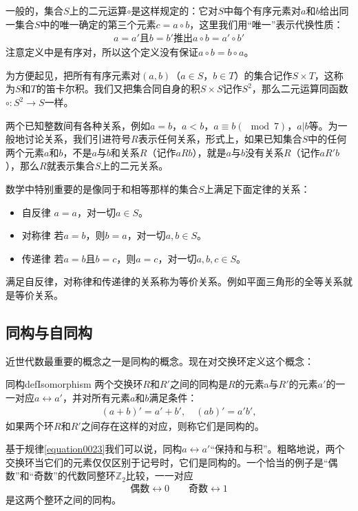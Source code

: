 一般的，集合$S$上的二元运算$\circ$是这样规定的：它对$S$中每个有序元素对$a$和$b$给出同一集合$S$中的唯一确定的第三个元素$c=a \circ b$，这里我们用“唯一”表示代换性质：
\begin{gather}\label{equation0022}
a=a'\text{且}b=b'\text{推出}a \circ b = a' \circ b'
\end{gather}
注意定义中是有序对，所以这个定义没有保证$a \circ b = b \circ a$。

为方便起见，把所有有序元素对$(a, b)$（$a \in S$，$b \in T$）的集合记作$S \times T$，这称为$S$和$T$的笛卡尔积。我们又把集合同自身的积$S \times S$记作$S^2$，那么二元运算同函数$\circ: S^2 \to S$一样。

两个已知整数间有各种关系，例如$a=b$，$a<b$，$a \equiv b(\mod{7})$，$a|b$等。为一般地讨论关系，我们引进符号$R$表示任何关系，形式上，如果已知集合$S$中的任何两个元素$a$和$b$，不是$a$与$b$和关系$R$（记作$aRb$），就是$a$与$b$没有关系$R$（记作$aR'b$），那么$R$就表示集合$S$上的二元关系。

数学中特别重要的是像同于和相等那样的集合$S$上满足下面定律的关系：
\begin{itemize}
\item 自反律 $a=a$，对一切$a \in S$。
\item 对称律 若$a=b$，则$b=a$，对一切$a, b \in S$。
\item 传递律 若$a=b$且$b=c$，则$a=c$，对一切$a, b, c \in S$。
\end{itemize}
满足自反律，对称律和传递律的关系称为等价关系。例如平面三角形的全等关系就是等价关系。

\subsection{同构与自同构}
近世代数最重要的概念之一是同构的概念。现在对交换环定义这个概念：
\begin{definition}{同构}{defIsomorphism}
两个交换环$R$和$R'$之间的同构是$R$的元素a与$R'$的元素$a'$的一一对应$a \leftrightarrow a'$，并对所有元素$a$和$b$满足条件：
\begin{gather}\label{equation0023}
(a+b)'=a'+b',\quad (ab)'=a'b',
\end{gather}
如果两个环$R$和$R'$之间存在这样的对应，则称它们是同构的。
\end{definition}
基于规律\ref{equation0023}我们可以说，同构$a \leftrightarrow a'$“保持和与积”。粗略地说，两个交换环当它们的元素仅仅区别于记号时，它们是同构的。一个恰当的例子是“偶数”和“奇数”的代数同整环$\mathbb{Z}_2$比较，一一对应
\[
\text{偶数}\leftrightarrow 0 \quad\quad \text{奇数}\leftrightarrow 1
\]
是这两个整环之间的同构。

